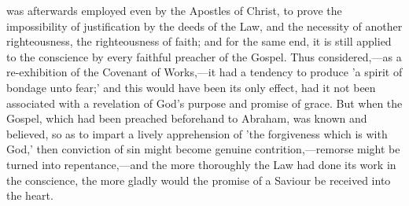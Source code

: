 \documentclass[
]{book}
\begin{document}
was afterwards employed even by the Apostles of Christ, to prove the impossibility of justification by the deeds of the Law, and the necessity of another righteousness, the righteousness of faith; and for the same end, it is still applied to the conscience by every faithful preacher of the Gospel. Thus considered,---as a re-exhibition of the Covenant of Works,---it had a tendency to produce 'a spirit of bondage unto fear;' and this would have been its only effect, had it not been associated with a revelation of God's purpose and promise of grace. But when the Gospel, which had been preached beforehand to Abraham, was known and believed, so as to impart a lively apprehension of 'the forgiveness which is with God,' then conviction of sin might become genuine contrition,---remorse might be turned into repentance,---and the more thoroughly the Law had done its work in the conscience, the more gladly would the promise of a Saviour be received into the heart.
\end{document}
